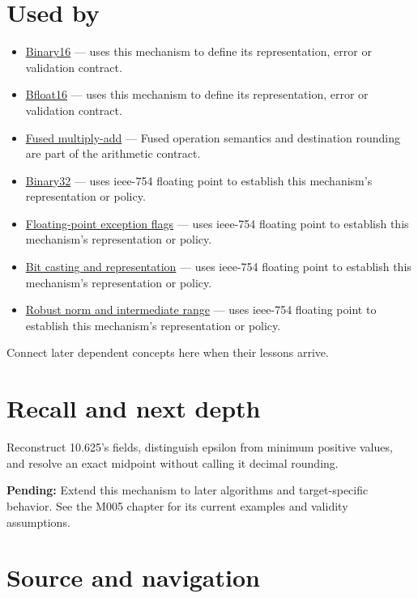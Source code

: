 \section{Used by}\label{appendix-343615f49ddf-used-by}

\begin{itemize}
\item
  \hyperref[appendix-34443cec7170]{Binary16} --- uses this mechanism to define its representation, error or validation contract.
\item
  \hyperref[appendix-18b8dd966b5d]{Bfloat16} --- uses this mechanism to define its representation, error or validation contract.
\item
  \hyperref[appendix-41e8ef22a21e]{Fused multiply-add} --- Fused operation semantics and destination rounding are part of the arithmetic contract.
\item
  \hyperref[appendix-5057f9ad327f]{Binary32} --- uses ieee-754 floating point to establish this mechanism's representation or policy.
\item
  \hyperref[appendix-ed8531b46754]{Floating-point exception flags} --- uses ieee-754 floating point to establish this mechanism's representation or policy.
\item
  \hyperref[appendix-34ee45f161c1]{Bit casting and representation} --- uses ieee-754 floating point to establish this mechanism's representation or policy.
\item
  \hyperref[appendix-7f1e17dcafb1]{Robust norm and intermediate range} --- uses ieee-754 floating point to establish this mechanism's representation or policy.
\end{itemize}

Connect later dependent concepts here when their lessons arrive.

\section{Recall and next depth}\label{appendix-343615f49ddf-recall-and-next-depth}

Reconstruct 10.625's fields, distinguish epsilon from minimum positive values, and resolve an exact midpoint without calling it decimal rounding.

\textbf{Pending:} Extend this mechanism to later algorithms and target-specific behavior. See the M005 chapter for its current examples and validity assumptions.

\section{Source and navigation}\label{appendix-343615f49ddf-source-and-navigation}

